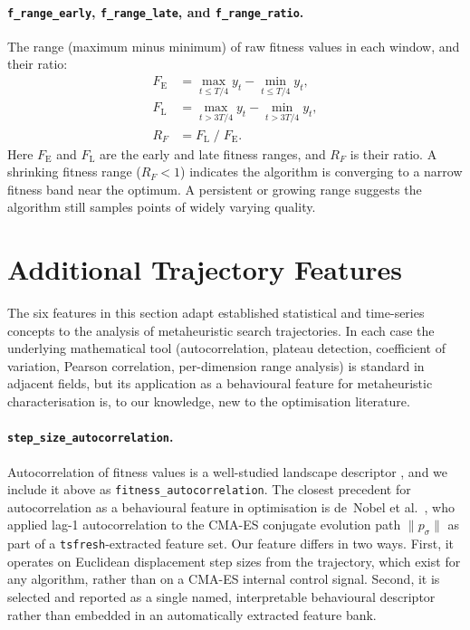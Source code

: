 \paragraph{\texttt{f\_range\_early}, \texttt{f\_range\_late}, and
\texttt{f\_range\_ratio}.}
The range (maximum minus minimum) of raw fitness values in each window, and
their ratio:
\begin{align}
\label{eq:frange}
  F_{\mathrm{E}} &= \max_{t \le T/4} y_t
                    - \min_{t \le T/4} y_t, \\
  F_{\mathrm{L}} &= \max_{t > 3T/4} y_t
                    - \min_{t > 3T/4} y_t, \\
  R_F            &= F_{\mathrm{L}} \;/\; F_{\mathrm{E}}.
\end{align}
Here $F_{\mathrm{E}}$ and $F_{\mathrm{L}}$ are the early and late
fitness ranges, and $R_F$ is their ratio.
A shrinking fitness range ($R_F < 1$) indicates the algorithm is
converging
to a narrow fitness band near the optimum. A persistent or growing range
suggests the algorithm still samples points of widely varying quality.

\section{Additional Trajectory Features}
\label{sec:features:novel}

The six features in this section adapt established statistical and time-series concepts to the analysis of metaheuristic search trajectories. In each case the underlying mathematical tool (autocorrelation, plateau detection, coefficient of variation, Pearson correlation, per-dimension range analysis) is standard in adjacent fields, but its application as a behavioural feature for metaheuristic characterisation is, to our knowledge, new to the optimisation literature.

\paragraph{\texttt{step\_size\_autocorrelation}.}
\label{sec:features:novel:ssac}

Autocorrelation of fitness values is a well-studied landscape descriptor
\cite{weinberger1990fitness}, and we include it above as
\texttt{fitness\_autocorrelation}.  The closest precedent for
autocorrelation as a behavioural feature in optimisation is de~Nobel et
al.~\cite{deNobel2021tsfresh}, who applied lag-1 autocorrelation to the
CMA-ES conjugate evolution path $\lVert p_\sigma \rVert$ as part of a
\texttt{tsfresh}-extracted feature set.  Our feature differs in two
ways.  First, it operates on Euclidean displacement step sizes from the
trajectory, which exist for any algorithm, rather than on a CMA-ES
internal control signal.  Second, it is selected and reported as a
single named, interpretable behavioural descriptor rather than embedded
in an automatically extracted feature bank.

